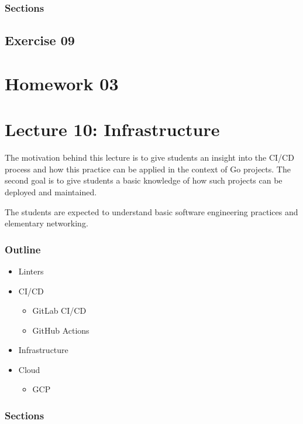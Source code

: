\documentclass[
  digital,
  color,
  oneside,
  nosansbold,
  nocolorbold,
  lof,
  lot,
]{fithesis4}
\begin{document}
\subsubsection{Sections}

\subsection{Exercise 09}

\section{Homework 03}

\section{Lecture 10: Infrastructure}

The motivation behind this lecture is to give students an insight into the CI/CD process and how this practice can be applied in the context of Go projects. The second goal is to give students a basic knowledge of how such projects can be deployed and maintained.

The students are expected to understand basic software engineering practices and elementary networking.

\subsubsection{Outline}

\begin{itemize}
    \item Linters
    \item CI/CD
    \begin{itemize}
        \item GitLab CI/CD
        \item GitHub Actions
    \end{itemize}
    \item Infrastructure
    \item Cloud
    \begin{itemize}
        \item GCP
    \end{itemize}
\end{itemize}

\subsubsection{Sections}
\end{document}
